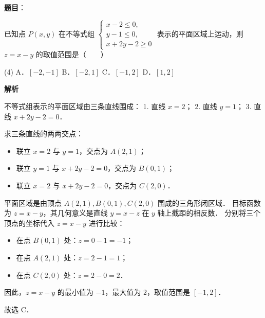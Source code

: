 \begin{answer}

\textbf{题目}：

已知点 $P(x, y)$ 在不等式组 $\begin{cases} x - 2 \leqslant 0, \\ y - 1 \leqslant 0, \\ x + 2y - 2 \geqslant 0 \end{cases}$ 表示的平面区域上运动，则 $z = x - y$ 的取值范围是\mbox{（　　）}

\begin{gkopts}(4)
\task A．$[-2, -1]$
\task B．$[-2, 1]$
\task C．$[-1, 2]$
\task D．$[1, 2]$
\end{gkopts}

\textbf{解析}

不等式组表示的平面区域由三条直线围成：
1. 直线 $x = 2$；
2. 直线 $y = 1$；
3. 直线 $x + 2y - 2 = 0$．

求三条直线的两两交点：
\begin{itemize}
\item 联立 $x = 2$ 与 $y = 1$，交点为 $A(2, 1)$；
\item 联立 $y = 1$ 与 $x + 2y - 2 = 0$，交点为 $B(0, 1)$；
\item 联立 $x = 2$ 与 $x + 2y - 2 = 0$，交点为 $C(2, 0)$．
\end{itemize}

平面区域是由顶点 $A(2, 1), B(0, 1), C(2, 0)$ 围成的三角形闭区域．
目标函数为 $z = x - y$，其几何意义是直线 $y = x - z$ 在 $y$ 轴上截距的相反数．
分别将三个顶点的坐标代入 $z = x - y$ 进行比较：
\begin{itemize}
\item 在点 $B(0, 1)$ 处：$z = 0 - 1 = -1$；
\item 在点 $A(2, 1)$ 处：$z = 2 - 1 = 1$；
\item 在点 $C(2, 0)$ 处：$z = 2 - 0 = 2$．
\end{itemize}

因此，$z = x - y$ 的最小值为 $-1$，最大值为 $2$，取值范围是 $[-1, 2]$．

故选 C．


\end{answer}
